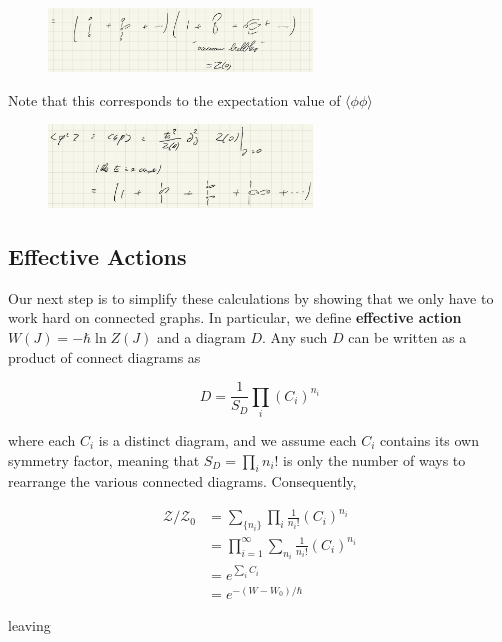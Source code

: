 \documentclass{article}
\theoremstyle{definition}
\begin{document}
\begin{figure}
  \centering
  \includegraphics[width=7cm]{res/AQFT/vacuum_bubble_product}
  \label{vacuum_bubble_product}
\end{figure}

Note that this corresponds to the expectation value of $\langle \phi \phi
\rangle$

\begin{figure}
  \centering
  \includegraphics[width=7cm]{res/AQFT/E_2_mean}
  \label{E_2_mean}
\end{figure}

\subsection{Effective Actions}

Our next step is to simplify these calculations by showing that we only have to
work hard on connected graphs. In particular, we define \textbf{effective
  action} $W(J) = -\hbar \ln Z(J)$
and a diagram $D$. Any such $D$ can be written as a product of connect diagrams
as

\begin{equation}
  D = \frac{1}{S_D} \prod_i (C_i)^{n_i}
\end{equation}

where each $C_i$ is a distinct diagram, and we assume each $C_i$ contains its
own symmetry factor, meaning that $S_D = \prod_i n_i!$ is only the number of
ways to rearrange the various connected diagrams. Consequently,

\begin{align*}
  \mathcal{Z} / \mathcal{Z}_0
  &= \sum_{\{n_i\}} \prod_i \frac{1}{n_i!} (C_i)^{n_i} \\
  &= \prod_{i=1}^\infty \sum_{n_i} \frac{1}{n_i!} (C_i)^{n_i} \\
  &= e^{\sum_i C_i} \\
  &= e^{-(W - W_0) / \hbar}
\end{align*}

leaving
\end{document}
